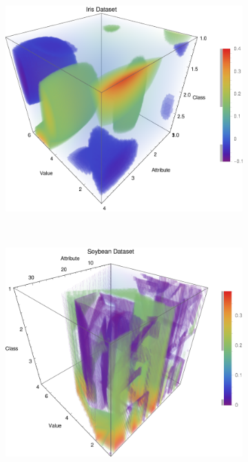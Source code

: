 \documentclass{article}
\begin{document}
\begin{figure}[h!]
\begin{subfigure}[b]{0.4\textwidth}
				\caption{}
				\label{p_glass}					
			\end{subfigure} \	
			\begin{subfigure}[b]{0.4\textwidth}
				\centering
				\includegraphics[width=\textwidth]{figs/NaiveBayes/plot_ptable_iris}	
				\caption{}
				\label{p_iris}				
			\end{subfigure} \	
			\begin{subfigure}[b]{0.4\textwidth}
				\centering
				\includegraphics[width=\textwidth]{figs/NaiveBayes/plot_ptable_soybean}	

\end{subfigure}
\end{figure}
\end{document}

